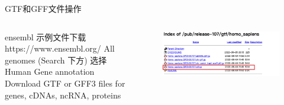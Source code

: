 \begin{frame}[fragile]{GTF和GFF文件操作}
    \begin{columns}
        \begin{myoutline}
            \1 ensembl 示例文件下载
                \2 https://www.ensembl.org/
                \2 All genomes (Search 下方)
                \2 选择 Human
                \2 Gene annotation
                \2 Download GTF or GFF3 files for genes, cDNAs, ncRNA, proteins
        \end{myoutline}
        \begin{figure}
            \centering
            \includegraphics[width=\linewidth]{Images/gtf_download.png}
        \end{figure}
    \end{columns}
\end{frame}